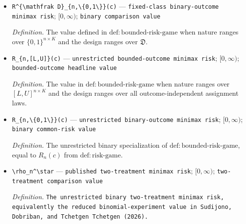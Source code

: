\documentclass{article}
\begin{document}
\begin{itemize}
  \par\smallskip\noindent\emph{Definition.} The value defined in \(\mathrm{def:bounded\text{-}risk\text{-}game}\) when nature ranges over \([L,U]^{n\times K}\) and the design ranges over \(\mathfrak D\).
  \item \texttt{R\textasciicircum{}\{\textbackslash{}\allowbreak{}mathfrak D\}\allowbreak{}\_\allowbreak{}\{n,\allowbreak{}\textbackslash{}\allowbreak{}\{0,\allowbreak{}1\textbackslash{}\allowbreak{}\}\allowbreak{}\}\allowbreak{}(c)} --- \texttt{fixed-\allowbreak{}class binary-\allowbreak{}outcome minimax risk}; \([0,\infty)\); \texttt{binary comparison value}
  \par\smallskip\noindent\emph{Definition.} The value defined in \(\mathrm{def:bounded\text{-}risk\text{-}game}\) when nature ranges over \(\{0,1\}^{n\times K}\) and the design ranges over \(\mathfrak D\).
  \item \texttt{R\_\allowbreak{}\{n,\allowbreak{}[L,\allowbreak{}U]\}\allowbreak{}(c)} --- \texttt{unrestricted bounded-\allowbreak{}outcome minimax risk}; \([0,\infty)\); \texttt{bounded-\allowbreak{}outcome headline value}
  \par\smallskip\noindent\emph{Definition.} The value in \(\mathrm{def:bounded\text{-}risk\text{-}game}\) when nature ranges over \([L,U]^{n\times K}\) and the design ranges over all outcome-independent assignment laws.
  \item \texttt{R\_\allowbreak{}\{n,\allowbreak{}\textbackslash{}\allowbreak{}\{0,\allowbreak{}1\textbackslash{}\allowbreak{}\}\allowbreak{}\}\allowbreak{}(c)} --- \texttt{unrestricted binary-\allowbreak{}outcome minimax risk}; \([0,\infty)\); \texttt{binary common-\allowbreak{}risk value}
  \par\smallskip\noindent\emph{Definition.} The unrestricted binary specialization of \(\mathrm{def:bounded\text{-}risk\text{-}game}\), equal to \(R_n(c)\) from \(\mathrm{def:risk\text{-}game}\).
  \item \texttt{\textbackslash{}\allowbreak{}rho\_\allowbreak{}n\textasciicircum{}\textbackslash{}\allowbreak{}star} --- \texttt{published two-\allowbreak{}treatment minimax risk}; \([0,\infty)\); \texttt{two-\allowbreak{}treatment comparison value}
  \par\smallskip\noindent\emph{Definition.} \texttt{The unrestricted binary two-\allowbreak{}treatment minimax risk,\allowbreak{} equivalently the reduced binomial-\allowbreak{}experiment value in Sudijono,\allowbreak{} Dobriban,\allowbreak{} and Tchetgen Tchetgen (2026).}
\end{itemize}
\end{document}
